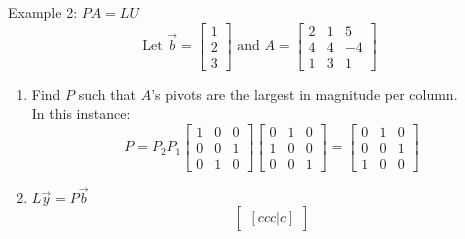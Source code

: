 \documentclass[10pt]{article}
\begin{document}
\begin{multicols}{2}
\begin{minipage}{0.95\columnwidth}
        Example 2: \(PA = LU\)
        \begin{equation*}
            \text{Let } \overrightarrow{b} = \begin{bmatrix}
                1 \\
                2 \\
                3
            \end{bmatrix}
            \text{ and } A = \begin{bmatrix}
                2 & 1 & 5  \\
                4 & 4 & -4 \\
                1 & 3 & 1
            \end{bmatrix}
        \end{equation*}
        \begin{enumerate}
            \item Find \(P\) such that \(A\)'s pivots are the largest in magnitude per column. \\
                  \footnotesize In this instance:
                  \begin{equation*}
                      P = P_2 P_1
                      \begin{bmatrix}
                          1 & 0 & 0 \\
                          0 & 0 & 1 \\
                          0 & 1 & 0
                      \end{bmatrix}
                      \begin{bmatrix}
                          0 & 1 & 0 \\
                          1 & 0 & 0 \\
                          0 & 0 & 1
                      \end{bmatrix}
                      = \begin{bmatrix}
                          0 & 1 & 0 \\
                          0 & 0 & 1 \\
                          1 & 0 & 0
                      \end{bmatrix}
                  \end{equation*}
                  \normalsize
            \item \(L \overrightarrow{y} = P\overrightarrow{b}\)
                  \begin{equation*}
                      \begin{bmatrix}[ccc|c]

\end{bmatrix}
\end{equation*}
\end{enumerate}
\end{minipage}
\end{multicols}
\end{document}
